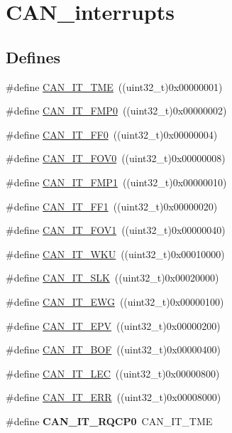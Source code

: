 \hypertarget{group__CAN__interrupts}{
\section{CAN\_\-interrupts}
\label{group__CAN__interrupts}
}
\subsection*{Defines}
\begin{DoxyCompactItemize}
\item 
\#define \hyperlink{group__CAN__interrupts_ga619e36230fa2eb089a7c1936b5004eb9}{CAN\_\-IT\_\-TME}~((uint32\_\-t)0x00000001)
\item 
\#define \hyperlink{group__CAN__interrupts_ga3fe6fbf53e9d692957e87ad329bcd362}{CAN\_\-IT\_\-FMP0}~((uint32\_\-t)0x00000002)
\item 
\#define \hyperlink{group__CAN__interrupts_gabf63043d9216de80ddc7ffe57b23ef67}{CAN\_\-IT\_\-FF0}~((uint32\_\-t)0x00000004)
\item 
\#define \hyperlink{group__CAN__interrupts_ga066a4317f95669e5b5931c9a759cf248}{CAN\_\-IT\_\-FOV0}~((uint32\_\-t)0x00000008)
\item 
\#define \hyperlink{group__CAN__interrupts_gaa0e101053fb203629e0e9a954213e71e}{CAN\_\-IT\_\-FMP1}~((uint32\_\-t)0x00000010)
\item 
\#define \hyperlink{group__CAN__interrupts_ga93b86d884ce0624b4b36c991fd75fc1c}{CAN\_\-IT\_\-FF1}~((uint32\_\-t)0x00000020)
\item 
\#define \hyperlink{group__CAN__interrupts_ga963301fdbede5f9a9665dc5b6210eaec}{CAN\_\-IT\_\-FOV1}~((uint32\_\-t)0x00000040)
\item 
\#define \hyperlink{group__CAN__interrupts_gac9c8767770d94de753dda9ad31f9af15}{CAN\_\-IT\_\-WKU}~((uint32\_\-t)0x00010000)
\item 
\#define \hyperlink{group__CAN__interrupts_ga639d4ab2777d9a2f8b7e67071b091059}{CAN\_\-IT\_\-SLK}~((uint32\_\-t)0x00020000)
\item 
\#define \hyperlink{group__CAN__interrupts_ga8a9f04ddf6ebe169d32b951a8ea135b3}{CAN\_\-IT\_\-EWG}~((uint32\_\-t)0x00000100)
\item 
\#define \hyperlink{group__CAN__interrupts_ga006b7b641d337a599ceac64b483e75dd}{CAN\_\-IT\_\-EPV}~((uint32\_\-t)0x00000200)
\item 
\#define \hyperlink{group__CAN__interrupts_gad63c39e6237aa07681a1f8ce2ff9e167}{CAN\_\-IT\_\-BOF}~((uint32\_\-t)0x00000400)
\item 
\#define \hyperlink{group__CAN__interrupts_gad670b6f001bf67f24e17d91ada50a61c}{CAN\_\-IT\_\-LEC}~((uint32\_\-t)0x00000800)
\item 
\#define \hyperlink{group__CAN__interrupts_ga65f1781c9165a2e9b5f77f1ed3990741}{CAN\_\-IT\_\-ERR}~((uint32\_\-t)0x00008000)
\item 
\hypertarget{group__CAN__interrupts_ga0c57058d6d14b2baa24a4895975b1371}{
\#define {\bfseries CAN\_\-IT\_\-RQCP0}~CAN\_\-IT\_\-TME}
\label{group__CAN__interrupts_ga0c57058d6d14b2baa24a4895975b1371}


\end{DoxyCompactItemize}
